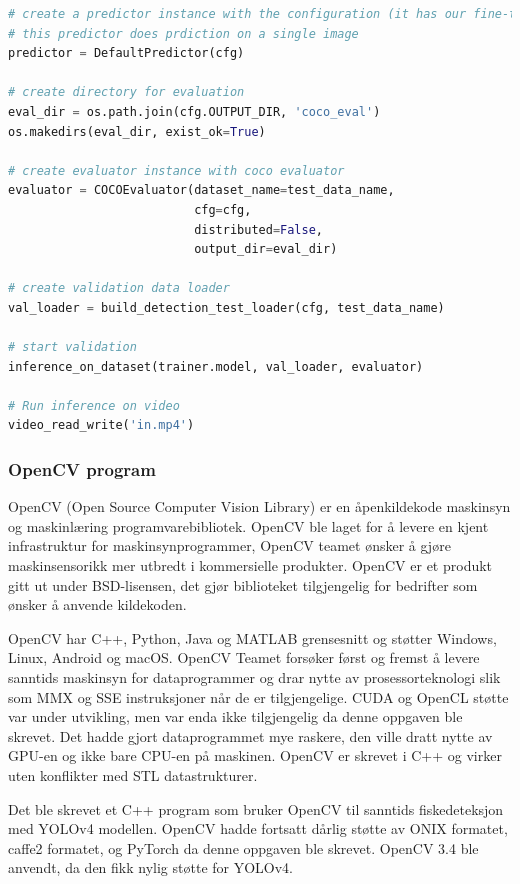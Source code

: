\begin{lstlisting}[language=Python, caption=Inferens RetinaNet i inference.py]
# create a predictor instance with the configuration (it has our fine-tuned model)
# this predictor does prdiction on a single image
predictor = DefaultPredictor(cfg)

# create directory for evaluation
eval_dir = os.path.join(cfg.OUTPUT_DIR, 'coco_eval')
os.makedirs(eval_dir, exist_ok=True)

# create evaluator instance with coco evaluator
evaluator = COCOEvaluator(dataset_name=test_data_name,
                          cfg=cfg,
                          distributed=False,
                          output_dir=eval_dir)

# create validation data loader
val_loader = build_detection_test_loader(cfg, test_data_name)

# start validation 
inference_on_dataset(trainer.model, val_loader, evaluator)

# Run inference on video
video_read_write('in.mp4')
\end{lstlisting}

\subsubsection{OpenCV program} \label{part:opencv}

OpenCV (Open Source Computer Vision Library) er en åpenkildekode maskinsyn og maskinlæring programvarebibliotek. OpenCV ble laget for å levere en kjent infrastruktur for maskinsynprogrammer, OpenCV teamet ønsker å gjøre maskinsensorikk mer utbredt i kommersielle produkter. OpenCV er et produkt gitt ut under BSD-lisensen, det gjør biblioteket tilgjengelig for bedrifter som ønsker å anvende kildekoden. \cite{OpenCV Team 2020}

OpenCV har C++, Python, Java og MATLAB grensesnitt og støtter Windows, Linux, Android og macOS. OpenCV Teamet forsøker først og fremst å levere sanntids maskinsyn for dataprogrammer og drar nytte av prosessorteknologi slik som MMX og SSE instruksjoner når de er tilgjengelige. CUDA og OpenCL støtte var under utvikling, men var enda ikke tilgjengelig da denne oppgaven ble skrevet. Det hadde gjort dataprogrammet mye raskere, den ville dratt nytte av GPU-en og ikke bare CPU-en på maskinen. OpenCV er skrevet i C++ og virker uten konflikter med STL datastrukturer. \cite{OpenCV Team 2020}

Det ble skrevet et C++ program som bruker OpenCV til sanntids fiskedeteksjon med YOLOv4 modellen. OpenCV hadde fortsatt dårlig støtte av ONIX formatet, caffe2 formatet, og PyTorch da denne oppgaven ble skrevet. OpenCV 3.4 ble anvendt, da den fikk nylig støtte for YOLOv4. \cite{OpenCV Team 2020}

